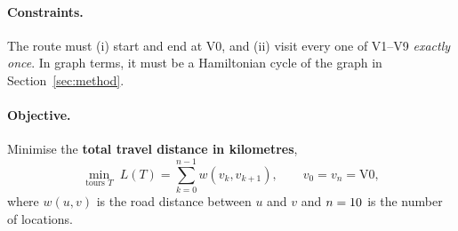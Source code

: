 \paragraph{Constraints.} The route must (i) start and end at V0, and (ii) visit every one of V1--V9
\emph{exactly once}. In graph terms, it must be a Hamiltonian cycle of the graph in Section~\ref{sec:method}.

\paragraph{Objective.} Minimise the \textbf{total travel distance in kilometres},
\[
  \min_{\text{tours } T} \; L(T) = \sum_{k=0}^{n-1} w(v_{k}, v_{k+1}), \qquad v_0 = v_n = \mathrm{V0},
\]
where $w(u,v)$ is the road distance between $u$ and $v$ and $n = 10$ is the number of locations.
